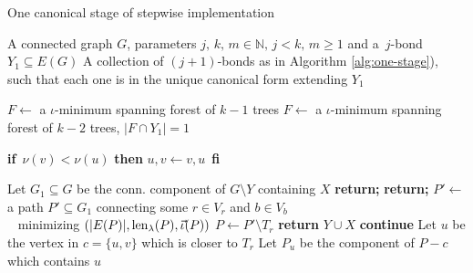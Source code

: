 \begin{algorithm}
	\caption{One canonical stage of stepwise implementation}
	\label{algorithm-can_one_step}
\begin{algorithmic}[1]
	\Require A connected graph $G$, parameters $j,\, k,\, m \in \mathbb{N},\, j < k,\, m \geq 1$ and a~$j$-bond $Y_1 \subseteq E(G)$
	\Ensure A collection of $(j+1)$-bonds as in Algorithm \ref{alg:one-stage}), such that each one is in the unique canonical form extending $Y_1$

		\State $F \leftarrow$ a $\iota$-minimum spanning forest of $k-1$ trees
		\Else
		\State $F \leftarrow$ a $\iota$-minimum spanning forest of $k-2$ trees, $\lvert F \cap Y_1 \rvert = 1$
	\EndIf

		\State \textbf{if} $ \, \nu(v) < \nu(u)$ \textbf{then}  $u,v \leftarrow v, u \,$ \textbf{fi}
		\State {}
	\EndFor

	\State Let $G_1 \subseteq G$ be the conn. component of $G \setminus Y$ containing $X$
		\State \textbf{return;}
	\EndIf
		\State \textbf{return;}
	\EndIf
	\State $P' \leftarrow$ a path $P' \subseteq G_1$ connecting some $r \in V_r$ and $b \in V_b$ \\
	\qquad \quad \,\,\, minimizing $(\lvert E(P) \rvert, \operatorname{len}_\lambda(P), \vec{\iota}(P) )$
	\State $P \leftarrow P' \setminus T_r$
		\State \textbf{return} $Y \cup X$ 
	\Else
				\State \textbf{continue}
			\EndIf
			\State Let $u$ be the vertex in $c = \{u,v\}$ which is closer to $T_r$
			\State Let $P_u$ be the component of $P - c$ which contains $u$
			\State {}
		\EndFor
	\EndIf

	\EndProcedure
\end{algorithmic}
\end{algorithm}

\clearpage


